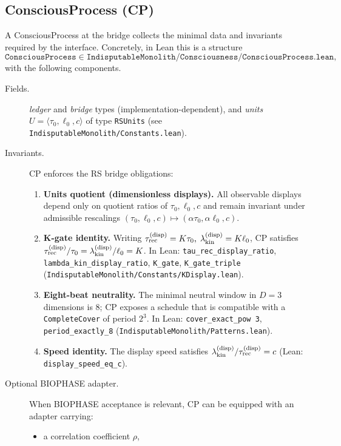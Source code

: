\documentclass[12pt,a4paper]{article}
\begin{document}
\subsection{ConsciousProcess (CP)}
A ConsciousProcess at the bridge collects the minimal data and invariants required by the interface. Concretely, in Lean this is a structure
\[
  \texttt{ConsciousProcess} \in \texttt{IndisputableMonolith/Consciousness/ConsciousProcess.lean},
\]
with the following components.
\begin{description}
  \item[Fields.] 
  \emph{ledger} and \emph{bridge} types (implementation-dependent), and \emph{units} \(U=\langle \tau_0,\ell_0,c\rangle\) of type \texttt{RSUnits} (see \texttt{IndisputableMonolith/Constants.lean}).
  \item[Invariants.] CP enforces the RS bridge obligations:
  \begin{enumerate}
    \item \textbf{Units quotient (dimensionless displays).} All observable displays depend only on quotient ratios of \(\tau_0,\ell_0,c\) and remain invariant under admissible rescalings \((\tau_0,\ell_0,c)\mapsto (\alpha\tau_0,\alpha\ell_0,c)\).
    \item \textbf{K-gate identity.} Writing
      \(
        \tau_{\rm rec}^{\rm (disp)} = K \tau_0,\;
        \lambda_{\rm kin}^{\rm (disp)} = K \ell_0
      \),
      CP satisfies
      \(
        \tau_{\rm rec}^{\rm (disp)}/\tau_0 = \lambda_{\rm kin}^{\rm (disp)}/\ell_0 = K
      \).
      In Lean: \texttt{tau\_rec\_display\_ratio}, \texttt{lambda\_kin\_display\_ratio}, \texttt{K\_gate}, \texttt{K\_gate\_triple} (\texttt{IndisputableMonolith/Constants/KDisplay.lean}).
    \item \textbf{Eight-beat neutrality.} The minimal neutral window in \(D=3\) dimensions is 8; CP exposes a schedule that is compatible with a \texttt{CompleteCover} of period \(2^3\). In Lean: \texttt{cover\_exact\_pow 3}, \texttt{period\_exactly\_8} (\texttt{IndisputableMonolith/Patterns.lean}).
    \item \textbf{Speed identity.} The display speed satisfies \(\lambda_{\rm kin}^{\rm (disp)}/\tau_{\rm rec}^{\rm (disp)} = c\) (Lean: \texttt{display\_speed\_eq\_c}).
  \end{enumerate}
  \item[Optional BIOPHASE adapter.] When BIOPHASE acceptance is relevant, CP can be equipped with an adapter carrying:
  \begin{itemize}
    \item a correlation coefficient \(\rho\),

\end{itemize}
\end{description}
\end{document}
